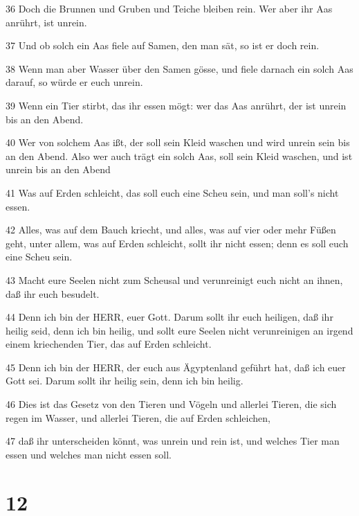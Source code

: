 \par 36 Doch die Brunnen und Gruben und Teiche bleiben rein. Wer aber ihr Aas anrührt, ist unrein.
\par 37 Und ob solch ein Aas fiele auf Samen, den man sät, so ist er doch rein.
\par 38 Wenn man aber Wasser über den Samen gösse, und fiele darnach ein solch Aas darauf, so würde er euch unrein.
\par 39 Wenn ein Tier stirbt, das ihr essen mögt: wer das Aas anrührt, der ist unrein bis an den Abend.
\par 40 Wer von solchem Aas ißt, der soll sein Kleid waschen und wird unrein sein bis an den Abend. Also wer auch trägt ein solch Aas, soll sein Kleid waschen, und ist unrein bis an den Abend
\par 41 Was auf Erden schleicht, das soll euch eine Scheu sein, und man soll's nicht essen.
\par 42 Alles, was auf dem Bauch kriecht, und alles, was auf vier oder mehr Füßen geht, unter allem, was auf Erden schleicht, sollt ihr nicht essen; denn es soll euch eine Scheu sein.
\par 43 Macht eure Seelen nicht zum Scheusal und verunreinigt euch nicht an ihnen, daß ihr euch besudelt.
\par 44 Denn ich bin der HERR, euer Gott. Darum sollt ihr euch heiligen, daß ihr heilig seid, denn ich bin heilig, und sollt eure Seelen nicht verunreinigen an irgend einem kriechenden Tier, das auf Erden schleicht.
\par 45 Denn ich bin der HERR, der euch aus Ägyptenland geführt hat, daß ich euer Gott sei. Darum sollt ihr heilig sein, denn ich bin heilig.
\par 46 Dies ist das Gesetz von den Tieren und Vögeln und allerlei Tieren, die sich regen im Wasser, und allerlei Tieren, die auf Erden schleichen,
\par 47 daß ihr unterscheiden könnt, was unrein und rein ist, und welches Tier man essen und welches man nicht essen soll.

\chapter{12}

